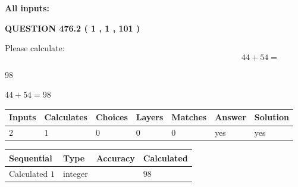 \documentclass[12pt]{article}
\begin{document}
   
   
   
\noindent\vspace{0.1in}\hspace{-0.08in} {\textbf{\Large{All inputs: }}}
   
   
  
\vspace{0.2in}
  
{\textbf{\Large{QUESTION
476.2 
 ( 1 , 1 , 101 )
}}}
  
  
 
Please calculate:
\begin{equation}
44 +  %
54 = \nonumber
\end{equation}
 
 
 
\noindent{}
 
 

98
 
 
\noindent{}
 
 

 
 
 
\noindent{}
 
 

$ %
44 +  %
54=   %
98$
 
 
\noindent{}
 
 

 
   
   
   
   
\noindent\begin{tabular}{|l|l|l|l|l|l|l|}
 \hline
Inputs & Calculates & Choices & Layers & Matches & Answer & Solution \\ \hline
 2  & 
 1  & 
 0
  & 
 0  & 
 0  & 
  yes & 
  yes 
  \\ \hline
 \end{tabular}
   
   
   
   
\noindent{}
   
   
  
  
\noindent\begin{tabular}{|l|l|l|l|}
\hline
 Sequential & Type & Accuracy & Calculated \\ 
\hline
 
 
  Calculated $  1 $ & integer &  & 
  $ 98 $ 
 \\  \hline  
 \end{tabular}
   
\end{document}
